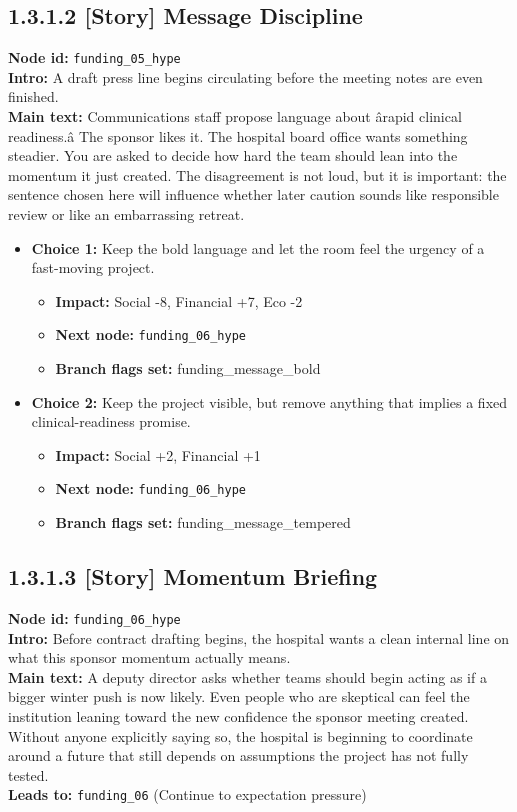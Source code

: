 \documentclass[11pt]{article}
\begin{document}
\subsection*{1.3.1.2 [Story] Message Discipline}
\textbf{Node id:} \texttt{funding\_05\_hype}\\
\textbf{Intro:} A draft press line begins circulating before the meeting notes are even finished.\\
\textbf{Main text:} Communications staff propose language about ârapid clinical readiness.â The sponsor likes it. The hospital board office wants something steadier. You are asked to decide how hard the team should lean into the momentum it just created. The disagreement is not loud, but it is important: the sentence chosen here will influence whether later caution sounds like responsible review or like an embarrassing retreat.\\
\begin{itemize}
\item \textbf{Choice 1:} Keep the bold language and let the room feel the urgency of a fast-moving project.
\begin{itemize}
\item \textbf{Impact:} Social -8, Financial +7, Eco -2
\item \textbf{Next node:} \texttt{funding\_06\_hype}
\item \textbf{Branch flags set:} funding\_message\_bold
\end{itemize}
\item \textbf{Choice 2:} Keep the project visible, but remove anything that implies a fixed clinical-readiness promise.
\begin{itemize}
\item \textbf{Impact:} Social +2, Financial +1
\item \textbf{Next node:} \texttt{funding\_06\_hype}
\item \textbf{Branch flags set:} funding\_message\_tempered
\end{itemize}
\end{itemize}
\subsection*{1.3.1.3 [Story] Momentum Briefing}
\textbf{Node id:} \texttt{funding\_06\_hype}\\
\textbf{Intro:} Before contract drafting begins, the hospital wants a clean internal line on what this sponsor momentum actually means.\\
\textbf{Main text:} A deputy director asks whether teams should begin acting as if a bigger winter push is now likely. Even people who are skeptical can feel the institution leaning toward the new confidence the sponsor meeting created. Without anyone explicitly saying so, the hospital is beginning to coordinate around a future that still depends on assumptions the project has not fully tested.\\
\textbf{Leads to:} \texttt{funding\_06} (Continue to expectation pressure)\\
\end{document}
